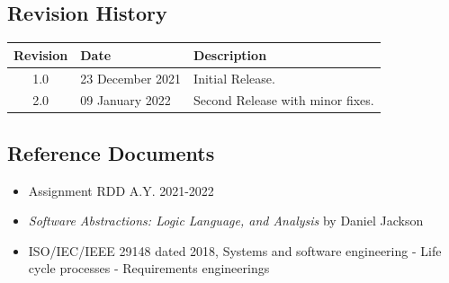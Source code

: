 \subsection{Revision History}


\begin{flushleft}
\renewcommand{\arraystretch}{1.25}
\begin{tabular}{|c| l|>{\raggedright\arraybackslash}p{12cm} |} \hline
    \textbf{Revision} & \textbf{Date} & \textbf{Description}\\ \hline 
    1.0 & 23 December 2021 & Initial Release.\\ 
    2.0 & 09 January 2022 & Second Release with minor fixes.\\
    \hline
\end{tabular}
\end{flushleft}


\subsection{Reference Documents}
\begin{itemize}
\item Assignment RDD A.Y. 2021-2022
\item \textit{Software Abstractions: Logic Language, and Analysis} by Daniel Jackson
\item ISO/IEC/IEEE 29148 dated 2018, Systems and software engineering - Life cycle processes - Requirements engineerings
\end{itemize}



